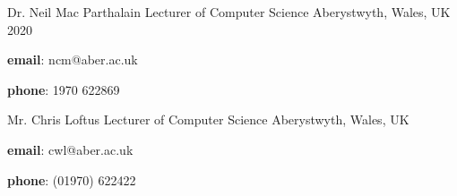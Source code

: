 

\begin{cventries}

  \cventry
    {Dr. Neil Mac Parthalain} %
    {Lecturer of Computer Science} %
    {Aberystwyth, Wales, UK} %
    {2020} %
    {
      \begin{cvitems} %
        \item {\textbf{email}: ncm@aber.ac.uk}
        \item {\textbf{phone}: 1970 622869}
      \end{cvitems}
    }
    
  \cventry
    {Mr. Chris Loftus} %
    {Lecturer of Computer Science} %
    {Aberystwyth, Wales, UK} %
    {} %
    {
      \begin{cvitems} %
        \item {\textbf{email}: cwl@aber.ac.uk}
        \item {\textbf{phone}: (01970) 622422}
      \end{cvitems}
    }

\end{cventries}
